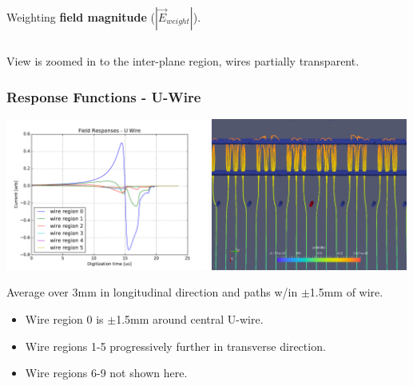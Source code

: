\documentclass[xcolor=dvipsnames]{beamer}
\begin{document}
\begin{frame}
\begin{columns}
\begin{column}{0.5\textwidth}
\begin{center}
        Weighting \textbf{field magnitude} ($|\vec{E}_{weight}|$).
      \end{center}      
    \end{column}
  \end{columns}
  \begin{center}
    View is zoomed in to the inter-plane region, wires partially transparent.
  \end{center}
\end{frame}


\begin{frame}
  \frametitle{Response Functions - U-Wire}

  \begin{center}
    \includegraphics[height=5cm,clip,trim=0 0cm 0cm 0cm]{steps/ucurrent-responses.pdf}%
    \includegraphics[height=5cm,clip,trim=0 0cm 0cm 0cm]{steps/upaths-1.png}
  \end{center}

  \footnotesize 
  Average over 3mm in longitudinal direction and  paths w/in $\pm$1.5mm of wire.
  \begin{itemize}
  \item Wire region 0 is $\pm$1.5mm around central U-wire.
  \item Wire regions 1-5 progressively further in transverse direction.
  \item Wire regions 6-9 not shown here.
  \end{itemize}
\end{frame}
\end{document}
